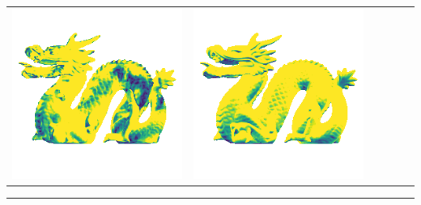 \begin{tabularx}{\linewidth}{@{}Y@{}Y@{}Y@{}Y@{}Y@{}Y@{}}
\includegraphics[width=\linewidth]{semisynthetic/20150514_21_marrnet_err.png} &
\includegraphics[width=\linewidth]{semisynthetic/20150514_21_ef_err.png} \\
\end{tabularx}
\begin{center}\rule{0.5\linewidth}{\linethickness}\end{center}

